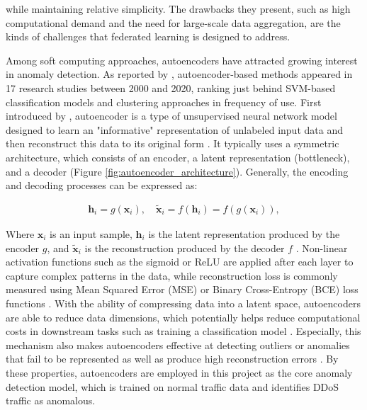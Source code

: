 while maintaining relative simplicity. The drawbacks they present, such as high computational demand and the need for large-scale data aggregation, are the kinds of challenges that federated learning is designed to address.

Among soft computing approaches, autoencoders have attracted growing interest in anomaly detection. As reported by \cite{9439459}, autoencoder-based methods appeared in 17 research studies between 2000 and 2020, ranking just behind SVM-based classification models and clustering approaches in frequency of use. First introduced by \cite{10.5555/104279.104293}, autoencoder is a type of unsupervised neural network model designed to learn an "informative" representation of unlabeled input data and then reconstruct this data to its original form \citep{michelucci2022introductionautoencoders}. It typically uses a symmetric architecture, which consists of an encoder, a latent representation (bottleneck), and a decoder (Figure \ref{fig:autoencoder_architecture}). Generally, the encoding and decoding processes can be expressed as:

\begin{align}
\mathbf{h}_i = g(\mathbf{x}_i), \quad \tilde{\mathbf{x}}_i = f(\mathbf{h}_i) = f(g(\mathbf{x}_i)),
\end{align}

Where $\mathbf{x}_i$ is an input sample, $\mathbf{h}_i$ is the latent representation produced by the encoder $g$, and $\tilde{\mathbf{x}}_i$ is the reconstruction produced by the decoder $f$ \citep{michelucci2022introductionautoencoders}. Non-linear activation functions such as the sigmoid or ReLU are applied after each layer to capture complex patterns in the data, while reconstruction loss is commonly measured using Mean Squared Error (MSE) or Binary Cross-Entropy (BCE) loss functions \citep{michelucci2022introductionautoencoders}. With the ability of compressing data into a latent space, autoencoders are able to reduce data dimensions, which potentially helps reduce computational costs in downstream tasks such as training a classification model \citep{michelucci2022introductionautoencoders}. Especially, this mechanism also makes autoencoders effective at detecting outliers or anomalies that fail to be represented as well as produce high reconstruction errors \citep{michelucci2022introductionautoencoders}. By these properties, autoencoders are employed in this project as the core anomaly detection model, which is trained on normal traffic data and identifies DDoS traffic as anomalous.

